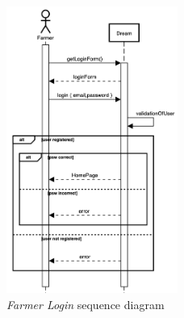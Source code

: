 \begin{enumerate}
        \begin{figure}[H]
        \begin{center}
        \includegraphics[width=0.5\textwidth]{sequence/FarmerLogin.png}
        \caption{\emph{Farmer Login} sequence diagram}
        \label{fig:sequence2}
        \end{center}
        \end{figure}



\end{enumerate}
